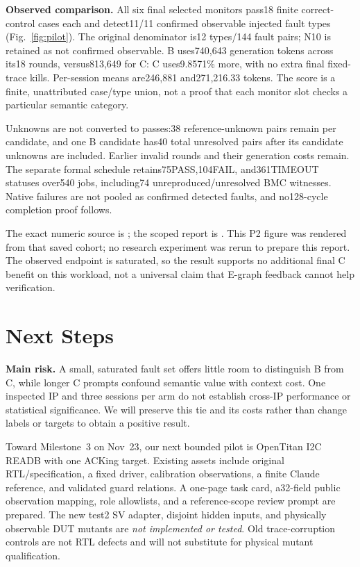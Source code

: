 \documentclass[conference,10pt,letterpaper]{IEEEtran}
\begin{document}
\textbf{Observed comparison.} All six final selected monitors pass18 finite
correct-control cases each and detect11/11 confirmed observable injected fault
types (Fig.~\ref{fig:pilot}). The original denominator is12 types/144 fault pairs;
N10 is retained as not confirmed observable. B uses740,643 generation tokens
across its18 rounds, versus813,649 for C: C uses9.8571\% more, with no extra final
fixed-trace kills. Per-session means are246,881 and271,216.33 tokens. The score
is a finite, unattributed case/type union, not a proof that each monitor slot
checks a particular semantic category.

Unknowns are not converted to passes:38 reference-unknown pairs remain per
candidate, and one B candidate has40 total unresolved pairs after its candidate
unknowns are included. Earlier invalid rounds and their generation costs remain.
The separate formal schedule retains75PASS,104FAIL, and361TIMEOUT statuses over540
jobs, including74 unreproduced/unresolved BMC witnesses. Native failures are not
pooled as confirmed detected faults, and no128-cycle completion proof follows.

The exact numeric source is
; the scoped
report is .
This P2 figure was rendered from that saved cohort; no research experiment was
rerun to prepare this report. The observed endpoint is saturated, so the result
supports no additional final C benefit on this workload, not a universal claim
that E-graph feedback cannot help verification.

\section{Next Steps}
\textbf{Main risk.} A small, saturated fault set offers little room to distinguish
B from C, while longer C prompts confound semantic value with context cost.
One inspected IP and three sessions per arm do not establish cross-IP
performance or statistical significance. We will preserve this tie and its
costs rather than change labels or targets to obtain a positive result.

Toward Milestone~3 on Nov~23, our next bounded pilot is OpenTitan I2C READB with
one ACKing target. Existing assets include original RTL/specification, a fixed
driver, calibration observations, a finite Claude reference, and validated guard
relations. A one-page task card, a32-field public observation mapping, role
allowlists, and a reference-scope review prompt are prepared. The new test2 SV
adapter, disjoint hidden inputs, and physically observable DUT mutants are
\emph{not implemented or tested}. Old trace-corruption controls are not RTL
defects and will not substitute for physical mutant qualification.
\end{document}
